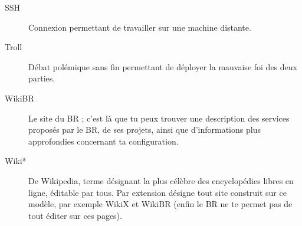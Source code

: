 \begin{description}
  \item[SSH] Connexion permettant de travailler sur une machine distante.
  \item[Troll] Débat polémique sans fin permettant de déployer la mauvaise foi des deux parties.
  \item[WikiBR] Le site du BR ; c'est là que tu peux trouver une description des services proposés par le BR, de ses projets, ainsi que
  d'informations plus approfondies concernant ta configuration.
  \item[Wiki*] De Wikipedia, terme d\'esignant la plus c\'el\`ebre des encyclop\'edies libres en ligne, \'editable par tous. Par extension d\'esigne tout site construit sur ce mod\`ele, par exemple WikiX et WikiBR (enfin le BR ne te permet pas de tout \'editer sur ces pages).
\end{description}
